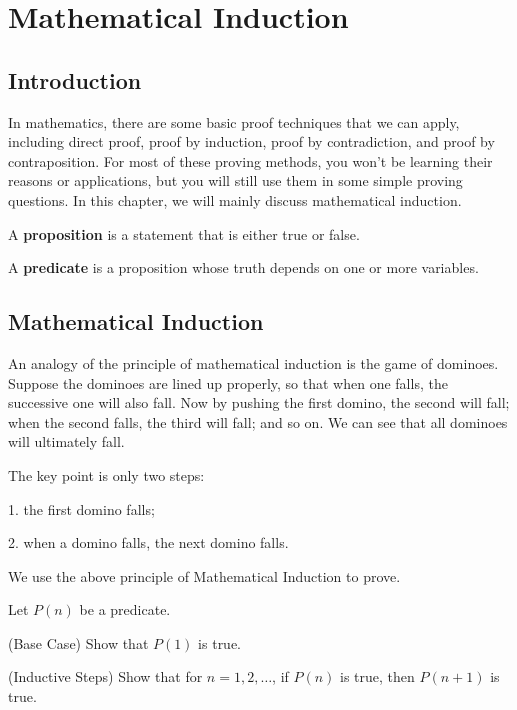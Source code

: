 \chapter{Mathematical Induction}

\section{Introduction}

In mathematics, there are some basic proof techniques that we can apply, including direct proof, proof by induction, proof by contradiction, and proof by contraposition. For most of these proving methods, you won't be learning their reasons or applications, but you will still use them in some simple proving questions. In this chapter, we will mainly discuss mathematical induction.

\begin{definition}[Proposition]
  A \textbf{proposition} is a statement that is either true or false. 
\end{definition}

\begin{definition}[Predicate]
  A \textbf{predicate} is a proposition whose truth depends on one or more variables.
\end{definition}

\section{Mathematical Induction}

An analogy of the principle of mathematical induction is the game of dominoes. Suppose the dominoes are lined up properly, so that when one falls, the successive one will also fall. Now by pushing the first domino, the second will fall; when the second falls, the third will fall; and so on. We can see that all dominoes will ultimately fall.

The key point is only two steps:

1. the first domino falls;

2. when a domino falls, the next domino falls.

We use the above principle of Mathematical Induction to prove. 

Let \(P(n)\) be a predicate. 

(Base Case) Show that \(P(1)\) is true.

(Inductive Steps) Show that for \(n = 1, 2, \dots\), if \(P(n)\) is true, then \(P(n+1)\) is true.


